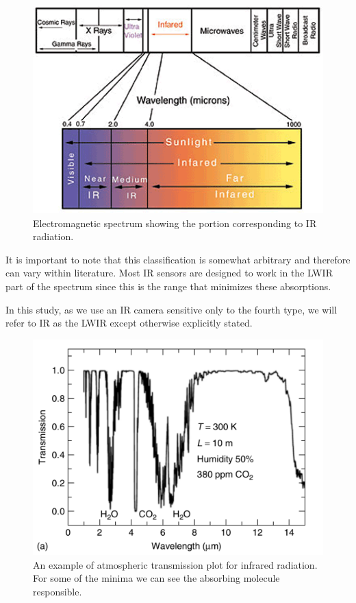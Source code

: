 		\begin{figure}[ht!]
			\centering
			\captionsetup{justification=centering,margin=2cm}
			\includegraphics[scale=0.75]{Figures/Chapter01/lightspectrum.pdf}
			\caption{Electromagnetic spectrum showing the portion corresponding to IR radiation.}\label{fig1.1}
		\end{figure}
		
		It is important to note that this classification is somewhat arbitrary and therefore can vary within literature. Most IR sensors are designed to work in the LWIR part of the spectrum since this is the range that minimizes these absorptions. 
		
		In this study, as we use an IR camera sensitive only to the fourth type, we will refer to IR as the LWIR except otherwise explicitly stated.
				
		\begin{figure}[ht!]
			\centering
			\captionsetup{justification=centering,margin=2cm}
			\includegraphics[scale=0.35]{Figures/Chapter01/Transmission.pdf}
			\caption{An example of atmospheric transmission plot  for infrared radiation. For some of the minima we can see the absorbing molecule responsible.}\label{fig1.2}
		\end{figure}
		
